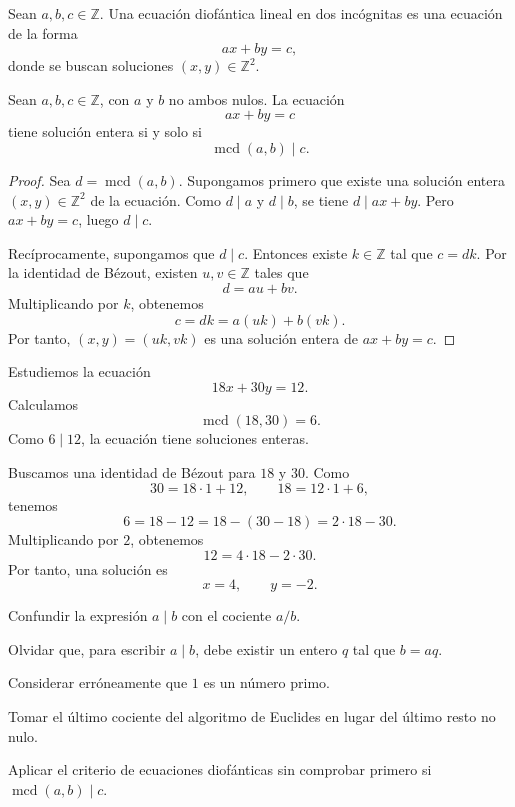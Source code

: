 \begin{definicion}
Sean \(a,b,c\in\mathbb{Z}\). Una ecuación diofántica lineal en dos incógnitas es una ecuación de la forma
\[
ax+by=c,
\]
donde se buscan soluciones \((x,y)\in\mathbb{Z}^2\).
\end{definicion}

\begin{teorema}
Sean \(a,b,c\in\mathbb{Z}\), con \(a\) y \(b\) no ambos nulos. La ecuación
\[
ax+by=c
\]
tiene solución entera si y solo si
\[
\operatorname{mcd}(a,b)\mid c.
\]
\end{teorema}

\begin{proof}
Sea \(d=\operatorname{mcd}(a,b)\). Supongamos primero que existe una solución entera \((x,y)\in\mathbb{Z}^2\) de la ecuación. Como \(d\mid a\) y \(d\mid b\), se tiene \(d\mid ax+by\). Pero \(ax+by=c\), luego \(d\mid c\).

Recíprocamente, supongamos que \(d\mid c\). Entonces existe \(k\in\mathbb{Z}\) tal que \(c=dk\). Por la identidad de Bézout, existen \(u,v\in\mathbb{Z}\) tales que
\[
d=au+bv.
\]
Multiplicando por \(k\), obtenemos
\[
c=dk=a(uk)+b(vk).
\]
Por tanto, \((x,y)=(uk,vk)\) es una solución entera de \(ax+by=c\).
\end{proof}

\begin{ejemplo}
Estudiemos la ecuación
\[
18x+30y=12.
\]
Calculamos
\[
\operatorname{mcd}(18,30)=6.
\]
Como \(6\mid 12\), la ecuación tiene soluciones enteras.

Buscamos una identidad de Bézout para \(18\) y \(30\). Como
\[
30=18\cdot 1+12,
\qquad
18=12\cdot 1+6,
\]
tenemos
\[
6=18-12=18-(30-18)=2\cdot 18-30.
\]
Multiplicando por \(2\), obtenemos
\[
12=4\cdot 18-2\cdot 30.
\]
Por tanto, una solución es
\[
x=4,
\qquad
y=-2.
\]
\end{ejemplo}

\begin{erroresfrecuentes}
  \item Confundir la expresión \(a\mid b\) con el cociente \(a/b\).
  \item Olvidar que, para escribir \(a\mid b\), debe existir un entero \(q\) tal que \(b=aq\).
  \item Considerar erróneamente que \(1\) es un número primo.
  \item Tomar el último cociente del algoritmo de Euclides en lugar del último resto no nulo.
  \item Aplicar el criterio de ecuaciones diofánticas sin comprobar primero si \(\operatorname{mcd}(a,b)\mid c\).
\end{erroresfrecuentes}

